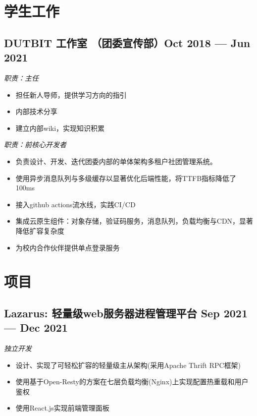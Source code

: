 \documentclass[a4,12pt]{article}
\newcommand{\subtext}[1]{
#1\par\vspace{-0.3cm}}
\newenvironment{zitemize}{
\begin{itemize}\itemsep0pt \parskip0pt \parsep1pt}
{\end{itemize}\vspace{-0.5cm}}
\begin{document}
\vspace{-0.3cm}
\section{\textbf{学生工作}}
\subsection*{DUTBIT 工作室 （团委宣传部）\hfill  Oct 2018 --- Jun 2021} 

\subtext{\textit{职责：主任}}
\vspace{-0.1cm}
\begin{zitemize}
    \item 担任新人导师，提供学习方向的指引
    \item 内部技术分享
    \item 建立内部wiki，实现知识积累
\end{zitemize}
\subtext{\textit{职责：前核心开发者}}
\vspace{-0.1cm}
    \begin{zitemize}
        \item 负责设计、开发、迭代团委内部的单体架构多租户社团管理系统。
        \item 使用异步消息队列与多级缓存以显著优化后端性能，将TTFB指标降低了100ms
        \item 接入github actions流水线，实践CI/CD
        \item 集成云原生组件：对象存储，验证码服务，消息队列，负载均衡与CDN，显著降低扩容复杂度
        \item 为校内合作伙伴提供单点登录服务 
    \end{zitemize}
\vspace{-0.3cm}
\section{\textbf{项目}}
\subsection*{Lazarus: {\normalsize\normalfont 轻量级web服务器进程管理平台} \hfill \textbf{Sep 2021 --- Dec 2021}}
\vspace{0.1cm}
\subtext{\textit{独立开发}}
\begin{zitemize}
    \item 设计、实现了可轻松扩容的轻量级主从架构(采用Apache Thrift RPC框架)
    \item 使用基于Open-Resty的方案在七层负载均衡(Nginx)上实现配置热重载和用户鉴权
    \item 使用React.js实现前端管理面板
\end{zitemize}
\end{document}
